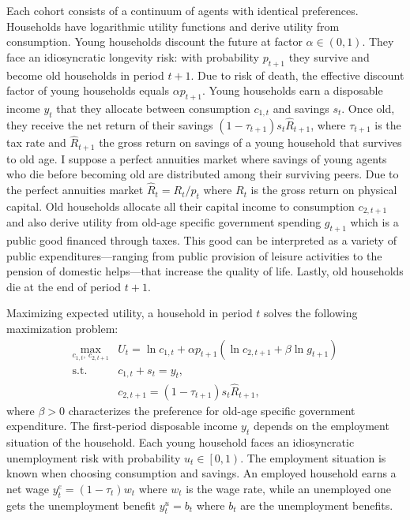 Each cohort consists of a continuum of agents with identical preferences. Households have logarithmic utility functions and derive utility from consumption. Young households discount the future at factor $\alpha \in \left(0,1\right)$. They face an idiosyncratic longevity risk: with probability $p_{t+1}$ they survive and become old households in period $t+1$. Due to risk of death, the effective discount factor of young households equals $\alpha p_{t+1}$. 
Young households earn a disposable income $y_t$ that they allocate between consumption $c_{1,t}$ and savings $s_t$. 
Once old, they receive the net return of their savings $(1-\tau_{t+1}) s_t \hat{R}_{t+1}$, where $\tau_{t+1}$ is the tax rate and $\hat{R}_{t+1}$ the gross return on savings of a young household that survives to old age. I suppose a perfect annuities market where savings of young agents who die before becoming old are distributed among their surviving peers. Due to the perfect annuities market $\hat{R}_t = R_t/p_t$ where $R_t$ is the gross return on physical capital. Old households allocate all their capital income to consumption $c_{2,t+1}$ and also derive utility from old-age specific government spending $g_{t+1}$ which is a public good financed through taxes. This good can be interpreted as a variety of public expenditures---ranging from public provision of leisure activities to the pension of domestic helps---that increase the quality of life. Lastly, old households die at the end of period $t+1$.

Maximizing expected utility, a household in period $t$ solves the following maximization problem:
\begin{align*}
	\max_{c_{1,t},~c_{2,t+1}}& U_t = \ln c_{1,t} + \alpha p_{t+1}\left( \ln c_{2,t+1} + \beta \ln g_{t+1} \right)\\
	\text{s.t.} ~~ &c_{1,t} + s_t = y_t,\\
	&c_{2,t+1} = (1-\tau_{t+1}) s_t \hat{R}_{t+1},
\end{align*}
where $\beta>0$ characterizes the preference for old-age specific government expenditure. The first-period disposable income $y_t$ depends on the employment situation of the household. Each young household faces an idiosyncratic unemployment risk with probability $u_t \in \left[0,1\right)$. The employment situation is known when choosing consumption and savings. An employed household earns a net wage $y_t^e= (1-\tau_t)w_t$ where $w_t$ is the wage rate, while an unemployed one gets the unemployment benefit $ y_t^u = b_t$ where $b_t$ are the unemployment benefits.


